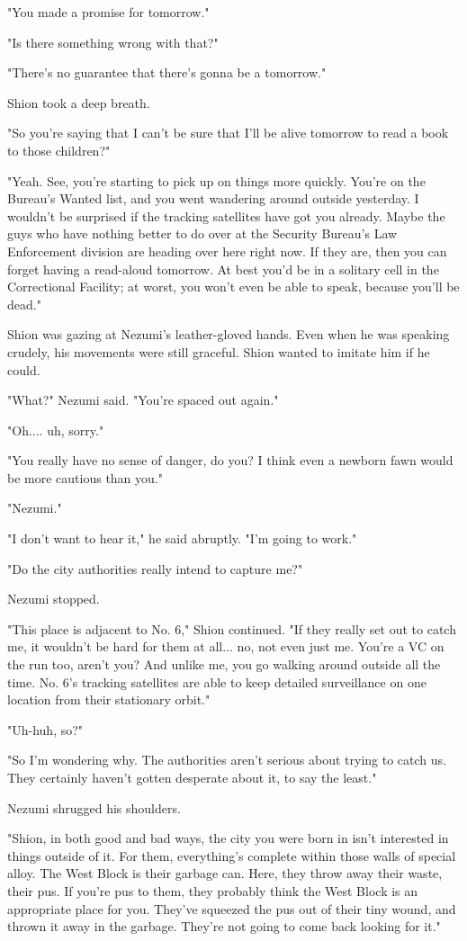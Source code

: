 "You made a promise for tomorrow."

"Is there something wrong with that?"

"There's no guarantee that there's gonna be a tomorrow."

Shion took a deep breath.

"So you're saying that I can't be sure that I'll be alive tomorrow to
read a book to those children?"

"Yeah. See, you're starting to pick up on things more quickly. You're on
the Bureau's Wanted list, and you went wandering around outside
yesterday. I wouldn't be surprised if the tracking satellites have got
you already. Maybe the guys who have nothing better to do over at the
Security Bureau's Law Enforcement division are heading over here right
now. If they are, then you can forget having a read-aloud tomorrow. At
best you'd be in a solitary cell in the Correctional Facility; at worst,
you won't even be able to speak, because you'll be dead."

Shion was gazing at Nezumi's leather-gloved hands. Even when he was
speaking crudely, his movements were still graceful. Shion wanted to
imitate him if he could.

"What?" Nezumi said. "You're spaced out again."

"Oh.... uh, sorry."

"You really have no sense of danger, do you? I think even a newborn fawn
would be more cautious than you."

"Nezumi."

"I don't want to hear it," he said abruptly. "I'm going to work."

"Do the city authorities really intend to capture me?"

Nezumi stopped.

"This place is adjacent to No. 6," Shion continued. "If they really set
out to catch me, it wouldn't be hard for them at all... no, not even
just me. You're a VC on the run too, aren't you? And unlike me, you go
walking around outside all the time. No. 6's tracking satellites are
able to keep detailed surveillance on one location from their stationary
orbit."

"Uh-huh, so?"

"So I'm wondering why. The authorities aren't serious about trying to
catch us. They certainly haven't gotten desperate about it, to say the
least."

Nezumi shrugged his shoulders.

"Shion, in both good and bad ways, the city you were born in isn't
interested in things outside of it. For them, everything's complete
within those walls of special alloy. The West Block is their garbage
can. Here, they throw away their waste, their pus. If you're pus to
them, they probably think the West Block is an appropriate place for
you. They've squeezed the pus out of their tiny wound, and thrown it
away in the garbage. They're not going to come back looking for it."


